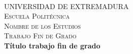 \documentclass[12pt,a4paper,twoside]{book}
\begin{document}
\sloppy
\pagebreak
\makeatletter

\begin{titlepage}
  \begin{adjustwidth}{-1.5cm}{0cm}

    \vspace{-3.5em}
    \hspace{-0.5em}
    \begin{minipage}{0.45\textwidth}
      \begin{flushleft}
        
      \end{flushleft}
    \end{minipage}

    \vspace{-6em}
    \hspace{20em}
    \begin{minipage}{0.45\textwidth}
      \begin{flushright}
        
      \end{flushright}
    \end{minipage}\\[1.5cm]

    \begin{center}
        \textsc{\LARGE UNIVERSIDAD DE EXTREMADURA}\\[4cm]

        \textsc{\Large Escuela Politécnica}\\[0.5cm]
        \textsc{\Large Nombre de los Estudios}\\[3cm]
        \textsc{\Large Trabajo Fin de Grado}\\[0.5cm]
          { \large \bfseries Título trabajo fin de grado}\\[4.0cm]
        \vfill
        {\large}
    \end{center}
  \end{adjustwidth}
\end{titlepage}

\pagestyle{empty}
\end{document}

